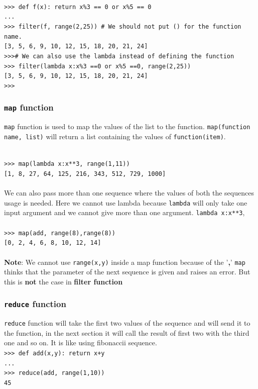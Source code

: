 \documentclass[12pt,a4paper]{article}
\begin{document}
\texttt{\\
>>> def f(x): return x\%3 == 0 or x\%5 == 0\\
...\\
>>> filter(f, range(2,25)) \# We should not put \texttt{()} for the function name.\\
{[3, 5, 6, 9, 10, 12, 15, 18, 20, 21, 24]}\\
>>>\# We can also use the lambda instead of defining the function\\
 >>> filter(lambda x:x\%3 ==0 or x\%5 ==0, range(2,25))\\
{[3, 5, 6, 9, 10, 12, 15, 18, 20, 21, 24]}\\
>>>}
\subsubsection{\texttt{map} function}
\texttt{map} function is used to map the values of the list to the function. \texttt{map(function name, list)} will return a list containing the values of \texttt{function(item)}.

\texttt{\\
>>> map(lambda x:x**3, range(1,11))\\
{[1, 8, 27, 64, 125, 216, 343, 512, 729, 1000]}\\
}\\
We can also pass more than one sequence where the values of both the sequences usage is needed. Here we cannot use lambda because \texttt{lambda} will only take one input argument and we cannot give more than one argument. \texttt{lambda x:x**3}, \\
\texttt{\\
>>> map(add, range(8),range(8))\\
{[0, 2, 4, 6, 8, 10, 12, 14]}\\
}\\
\textbf{Note}: We cannot use \texttt{range(x,y)} inside a map function because of the '\textbf{,}' \texttt{map} thinks that the parameter of the next sequence is given and raises an error. But this is \textbf{not} the case in \textbf{filter function}
\subsubsection{\texttt{reduce} function}
\texttt{reduce} function will take the first two values of the sequence and will send it to the function, in the next section it will call the result of first two with the third one and so on. It is like using fibonaccii sequence.
\texttt{\\
>>> def add(x,y): return x+y\\
...\\
>>> reduce(add, range(1,10))\\
45\\
}
\end{document}
